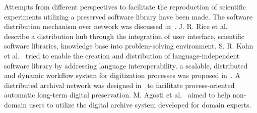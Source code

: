 

Attempts from different perspectives to facilitate the reproduction of scientific experiments utilizing a preserved software library have been made. 
The software distribution mechanism over network was discussed in~\cite{compostella2010cdf, blomer2011cernvm}.
J. R. Rice et al.~\cite{rice1996scientific} describe a distribution hub through the integration of user interface, scientific software libraries, knowledge base into problem-solving environment.
S. R. Kohn et al.~\cite{kohn2001divorcing} tried to enable the creation and distribution of language-independent software library by addressing language interoperability.
a scalable, distributed and dynamic workflow system for digitization processes was proposed in~\cite{schoneberg2013scalable}.
A distributed archival network was designed in~\cite{subotic2013distributed} to facilitate process-oriented automatic long-term digital preservation.
M. Agosti et al.~\cite{agosti2012envisage} aimed to help non-domain users to utilize the digital archive system developed for domain experts.





